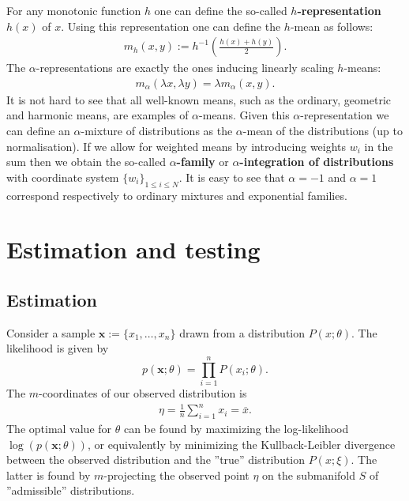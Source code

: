     For any monotonic function $h$ one can define the so-called \textbf{$h$-representation} $h(x)$ of $x$. Using this representation one can define the $h$-mean as follows:
    \begin{gather}
        m_h(x, y) := h^{-1}\left(\frac{h(x)+h(y)}{2}\right).
    \end{gather}
    The $\alpha$-representations are exactly the ones inducing linearly scaling $h$-means:
    \begin{gather}
        m_\alpha(\lambda x, \lambda y) = \lambda m_\alpha(x, y).
    \end{gather}
    It is not hard to see that all well-known means, such as the ordinary, geometric and harmonic means, are examples of $\alpha$-means. Given this $\alpha$-representation we can define an $\alpha$-mixture of distributions as the $\alpha$-mean of the distributions (up to normalisation). If we allow for weighted means by introducing weights $w_i$ in the sum then we obtain the so-called \textbf{$\alpha$-family} or \textbf{$\alpha$-integration of distributions} with coordinate system $\{w_i\}_{1\leq i\leq N}$. It is easy to see that $\alpha=-1$ and $\alpha=1$ correspond respectively to ordinary mixtures and exponential families.

\section{Estimation and testing}
\subsection{Estimation}

    Consider a sample $\mathbf{x}:=\{x_1,\ldots,x_n\}$ drawn from a distribution $P(x; \theta)$. The likelihood is given by \[p(\mathbf{x}; \theta) = \prod_{i=1}^nP(x_i; \theta).\] The $m$-coordinates of our observed distribution is
    \begin{gather}
        \eta = \frac{1}{n}\sum_{i=1}^nx_i = \overline{x}.
    \end{gather}
    The optimal value for $\theta$ can be found by maximizing the log-likelihood $\log(p(\mathbf{x}; \theta))$, or equivalently by minimizing the Kullback-Leibler divergence between the observed distribution and the ''true'' distribution $P(x; \xi)$. The latter is found by $m$-projecting the observed point $\eta$ on the submanifold $S$ of ''admissible'' distributions.